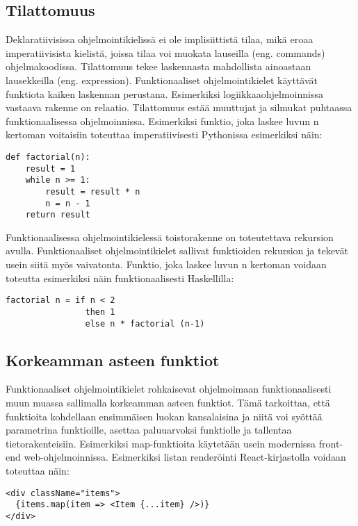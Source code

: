 \subsection{Tilattomuus}
Deklaratiivisissa ohjelmointikielissä ei ole implisiittistä tilaa, mikä eroaa imperatiivisista kielistä, joissa tilaa
voi muokata lauseilla (eng. commands) ohjelmakoodissa. Tilattomuus tekee laskennasta mahdollista ainoastaan lausekkeilla
(eng. expression). Funktionaaliset ohjelmointikielet käyttävät funktiota kaiken laskennan perustana. Esimerkiksi
logiikkaaohjelmoinnissa vastaava rakenne on relaatio. Tilattomuus estää muuttujat ja silmukat puhtaassa
funktionaalisessa ohjelmoinnissa. Esimerkiksi funktio, joka laskee luvun n kertoman voitaisiin toteuttaa
imperatiivisesti Pythonissa esimerkiksi näin:
\begin{verbatim}
def factorial(n):
    result = 1
    while n >= 1:
        result = result * n
        n = n - 1
    return result
\end{verbatim}
Funktionaalisessa ohjelmointikielessä toistorakenne on toteutettava rekursion avulla. Funktionaaliset ohjelmointikielet
sallivat funktioiden rekursion ja tekevät usein siitä myös vaivatonta.\cite{hudak} Funktio, joka laskee luvun n kertoman
voidaan toteutta esimerkiksi näin funktionaalisesti Haskellilla:
\begin{verbatim}
factorial n = if n < 2
                then 1
                else n * factorial (n-1)
\end{verbatim}

\subsection{Korkeamman asteen funktiot}
Funktionaaliset ohjelmointikielet rohkaisevat ohjelmoimaan funktionaalisesti muun muassa sallimalla korkeamman asteen
funktiot. Tämä tarkoittaa, että funktioita kohdellaan ensimmäisen luokan kansalaisina ja niitä voi syöttää parametrina
funktioille, asettaa paluuarvoksi funktiolle ja tallentaa tietorakenteisiin.\cite{hudak} Esimerkiksi map-funktioita
käytetään usein modernissa front-end web-ohjelmoinnissa\cite{functionalreact}. Esimerkiksi listan renderöinti React-kirjastolla voidaan
toteuttaa näin:
\begin{verbatim}
<div className="items">
  {items.map(item => <Item {...item} />)}
</div>
\end{verbatim}

